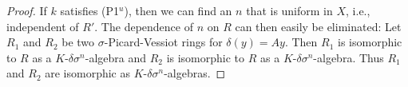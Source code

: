 \documentclass[oneside,reqno]{amsart}
\theoremstyle{definition}
\newcommand{\s}{\sigma}
\newcommand{\de}{\delta}
\newcommand{\ds}{\delta\sigma}
\newcommand{\po}{{\rm{(P1$^u$)}}}
\begin{document}
\begin{proof}
	 If $k$ satisfies \po{}, then we can find an $n$ that is uniform in $X$, i.e., independent of $R'$. The dependence of $n$ on $R$ can then easily be eliminated: Let $R_1$ and $R_2$ be two $\s$-Picard-Vessiot rings for $\de(y)=Ay$. Then $R_1$ is isomorphic to $R$ as a $K$-$\de\s^n$-algebra and $R_2$ is isomorphic to $R$ as a $K$-$\de\s^n$-algebra. Thus $R_1$ and $R_2$ are isomorphic as $K$-$\de\s^n$-algebras.
%	 
%	 
%	 
%	 
%	 
%	 
%
\end{proof}
\end{document}
